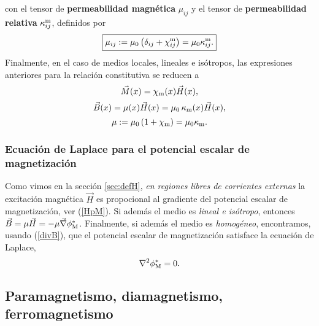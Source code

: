 con el tensor de \textbf{permeabilidad magnética} $\mu_{ij}$ y el
tensor de \textbf{permeabilidad relativa} $\kappa^{\rm m}_{ij}$, definidos por
\begin{equation}
 \boxed{\mu_{ij}:=\mu_0\left(\delta_{ij}+\chi^{\rm
m}_{ij}\right)=\mu_0\kappa^{\rm m}_{ij}.}
\end{equation}
Finalmente, en el caso de medios locales, lineales e isótropos, las
expresiones anteriores para la relación constitutiva se reducen a
\begin{equation}
 \vec{M}(x)=\chi_{\rm m}(x)\vec{H}(x),
\end{equation}
\begin{equation}
 \vec{B}(x)=\mu(x)\vec{H}(x)=\mu_0\,\kappa_{\rm m}(x)\vec{H}(x),
\end{equation}
\begin{equation}
 \mu:=\mu_0\left(1+\chi_{\rm m}\right)=\mu_0\kappa_{\rm m}.
\end{equation}


\subsubsection{Ecuación de Laplace para el potencial escalar de magnetización}
Como vimos en la sección \ref{sec:defH}, \textit{en regiones libres de corrientes externas} la excitación magnética $\vec{H}$ es propocional al gradiente del potencial escalar de magnetización, ver (\ref{HpM}). Si además el medio es \textit{lineal e isótropo}, entonces $\vec{B}=\mu\vec{H}=-\mu\vec{\nabla}\phi^\ast_{\rm M}$. Finalmente, si además el medio es \textit{homogéneo}, encontramos, usando (\ref{divB}), que el potencial escalar de magnetización satisface la ecuación de Laplace,
\begin{equation}
\nabla^2\phi^\ast_{\rm M}=0.
\end{equation}


\subsection{Paramagnetismo, diamagnetismo, ferromagnetismo}

